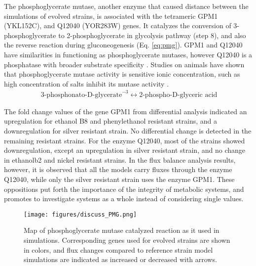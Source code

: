 The phosphoglycerate mutase, another enzyme that caused distance between the simulations of evolved strains, is associated with the tetrameric GPM1 (YKL152C), and Q12040 (YOR283W) genes. It catalyzes the conversion of 3-phosphoglycerate to 2-phosphoglycerate in glycolysis pathway (step 8), and also the reverse reaction during gluconeogenesis (Eq. \ref{eq:pmg}). GPM1 and Q12040 have similarities in functioning as phosphoglycerate mutases, however Q12040 is a phosphatase with broader substrate specificity \cite{ho2009identification}. Studies on animals have shown that phosphoglycerate mutase activity is sensitive ionic concentration, such as high concentration of salts inhibit its mutase activity \cite{grisolia1967mercury}.
\begin{align}
  \label{eq:pmg}
  \ \text{3-phosphonato-D-glycerate}^{-3} \leftrightarrow \text{2-phospho-D-glyceric acid}
\end{align}

The fold change values of the gene GPM1 from differential analysis indicated an upregulation for ethanol B8 and phenylethanol resistant strains, and a downregulation for silver resistant strain. No differential change is detected in the remaining resistant strains. For the enzyme Q12040, most of the strains showed downregulation, except an upregulation in silver resistant strain, and no change in ethanolb2 and nickel resistant strains. In the flux balance analysis results, however, it is observed that all the models carry fluxes through the enzyme Q12040, while only the silver resistant strain uses the enzyme GPM1. These oppositions put forth the importance of the integrity of metabolic systems, and promotes to investigate systems as a whole instead of considering single values.
\begin{figure}[H]
\texttt{[image: figures/discuss\_PMG.png]}
\caption[Map of phosphoglycerate mutase catalyzed reaction as it used in simulations]{Map of phosphoglycerate mutase catalyzed reaction as it used in simulations. Corresponding genes used for evolved strains are shown in colors, and flux changes compared to reference strain model simulations are indicated as increased or decreased with arrows.}
\label{fig:discuss_PMG}
\end{figure}

